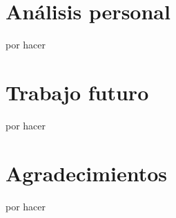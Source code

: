 \section{Análisis personal}

por hacer

\section{Trabajo futuro}

por hacer

\section{Agradecimientos}

por hacer
